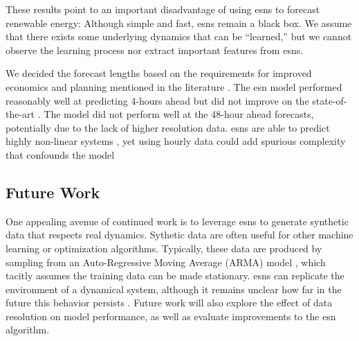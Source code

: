 These results point to an important disadvantage of using \glspl{esn} to
forecast renewable energy: Although simple and fast, \glspl{esn} remain a black box. We assume that there exists some underlying dynamics that
can be ``learned,'' but we cannot observe the learning process nor extract
important features from \glspl{esn}.

We decided the forecast lengths based on the requirements for improved
economics and planning mentioned in the literature
 \cite{wang_quantifying_2016,mc_garrigle_quantifying_2015,brancucci_martinez-anido_value_2016}. The \gls{esn} model performed reasonably well at predicting
 4-hours ahead but did not improve on the state-of-the-art
 \cite{wang_quantifying_2016,powers_weather_2017}. The model did not perform
 well at the 48-hour ahead forecasts, potentially due to the lack of higher
 resolution data. \glspl{esn} are able to predict highly non-linear
  systems \cite{jaeger_harnessing_2004,lukosevicius_reservoir_2009}, yet
 using hourly data could add spurious complexity that confounds the model
 \cite{garland_model-free_2014}

\subsection{Future Work}
One appealing avenue of continued work is to leverage \glspl{esn} to generate
synthetic data that respects real dynamics. Sythetic data are often useful for
other machine learning or optimization algorithms. Typically, these data are
produced by sampling from an Auto-Regressive Moving Average (ARMA) model \cite{baker_optimal_2018, garcia_dynamic_2016}, which tacitly assumes the
training data can be made stationary. \glspl{esn} can replicate
the environment of a dynamical system, although it remains unclear how far
in the future this behavior persists \cite{pathak_using_2017,pathak_model-free_2018}.
Future work will also explore the effect of data resolution on model
performance, as well as evaluate improvements to the \gls{esn}
algorithm.
